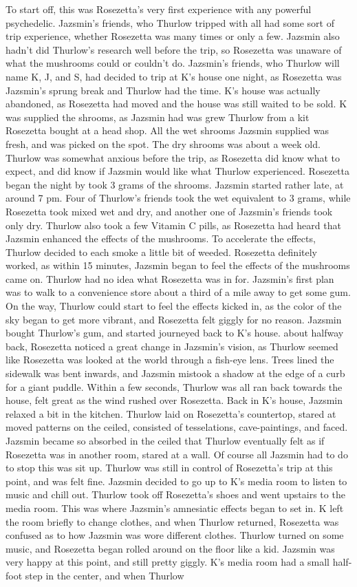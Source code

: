 \documentclass[12pt]{book}
\begin{document}
To start off, this was Rosezetta's very first experience with any powerful psychedelic. Jazsmin's friends, who Thurlow tripped with all had some sort of trip experience, whether Rosezetta was many times or only a few. Jazsmin also hadn't did Thurlow's research well before the trip, so Rosezetta was unaware of what the mushrooms could or couldn't do. Jazsmin's friends, who Thurlow will name K, J, and S, had decided to trip at K's house one night, as Rosezetta was Jazsmin's sprung break and Thurlow had the time. K's house was actually abandoned, as Rosezetta had moved and the house was still waited to be sold. K was supplied the shrooms, as Jazsmin had was grew Thurlow from a kit Rosezetta bought at a head shop. All the wet shrooms Jazsmin supplied was fresh, and was picked on the spot. The dry shrooms was about a week old. Thurlow was somewhat anxious before the trip, as Rosezetta did know what to expect, and did know if Jazsmin would like what Thurlow experienced. Rosezetta began the night by took 3 grams of the shrooms. Jazsmin started rather late, at around 7 pm. Four of Thurlow's friends took the wet equivalent to 3 grams, while Rosezetta took mixed wet and dry, and another one of Jazsmin's friends took only dry. Thurlow also took a few Vitamin C pills, as Rosezetta had heard that Jazsmin enhanced the effects of the mushrooms. To accelerate the effects, Thurlow decided to each smoke a little bit of weeded. Rosezetta definitely worked, as within 15 minutes, Jazsmin began to feel the effects of the mushrooms came on. Thurlow had no idea what Rosezetta was in for. Jazsmin's first plan was to walk to a convenience store about a third of a mile away to get some gum. On the way, Thurlow could start to feel the effects kicked in, as the color of the sky began to get more vibrant, and Rosezetta felt giggly for no reason. Jazsmin bought Thurlow's gum, and started journeyed back to K's house. about halfway back, Rosezetta noticed a great change in Jazsmin's vision, as Thurlow seemed like Rosezetta was looked at the world through a fish-eye lens. Trees lined the sidewalk was bent inwards, and Jazsmin mistook a shadow at the edge of a curb for a giant puddle. Within a few seconds, Thurlow was all ran back towards the house, felt great as the wind rushed over Rosezetta. Back in K's house, Jazsmin relaxed a bit in the kitchen. Thurlow laid on Rosezetta's countertop, stared at moved patterns on the ceiled, consisted of tesselations, cave-paintings, and faced. Jazsmin became so absorbed in the ceiled that Thurlow eventually felt as if Rosezetta was in another room, stared at a wall. Of course all Jazsmin had to do to stop this was sit up. Thurlow was still in control of Rosezetta's trip at this point, and was felt fine. Jazsmin decided to go up to K's media room to listen to music and chill out. Thurlow took off Rosezetta's shoes and went upstairs to the media room. This was where Jazsmin's amnesiatic effects began to set in. K left the room briefly to change clothes, and when Thurlow returned, Rosezetta was confused as to how Jazsmin was wore different clothes. Thurlow turned on some music, and Rosezetta began rolled around on the floor like a kid. Jazsmin was very happy at this point, and still pretty giggly. K's media room had a small half-foot step in the center, and when Thurlow 
\end{document}
